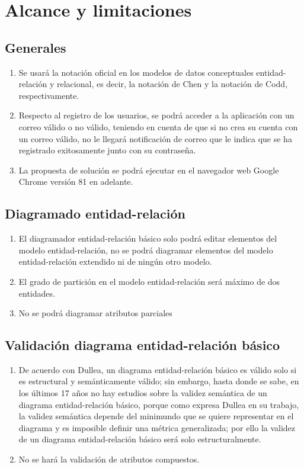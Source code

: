\section{Alcance y limitaciones}\label{sec:alcance}
\subsection*{Generales}
\begin{enumerate}
    \item Se usará la notación oficial en los modelos de datos conceptuales entidad-relación y relacional, es decir, la notación de Chen y la notación de Codd, respectivamente.
    \item Respecto al registro de los usuarios, se podrá acceder a la aplicación con un correo válido o no válido, teniendo en cuenta de que si no crea su cuenta con un correo válido, no le llegará notificación de correo que le indica que se ha registrado exitosamente junto con su contraseña.
    \item La propuesta de solución se podrá ejecutar en el navegador web Google Chrome versión 81 en adelante.
    
\end{enumerate}

\subsection*{Diagramado entidad-relación}
\begin{enumerate}
    \item El diagramador entidad-relación básico solo podrá editar elementos del modelo entidad-relación, no se podrá diagramar elementos del modelo entidad-relación extendido ni de ningún otro modelo.
    \item El grado de partición en el modelo entidad-relación será máximo de dos entidades.
    \item No se podrá diagramar atributos parciales
\end{enumerate}

\subsection*{Validación diagrama entidad-relación básico}
\begin{enumerate}
    \item De acuerdo con Dullea\cite{dullea_analysis_2003}, un diagrama entidad-relación básico es válido solo si es estructural y semánticamente válido; sin embargo, hasta donde se sabe, en los últimos 17 años no hay estudios sobre la validez semántica de un diagrama entidad-relación básico, porque como expresa Dullea en su trabajo, la validez semántica depende del minimundo que se quiere representar en el diagrama y es imposible definir una métrica generalizada; por ello la validez de un diagrama entidad-relación básico será solo estructuralmente.
    \item No se hará la validación de atributos compuestos.

\end{enumerate}

